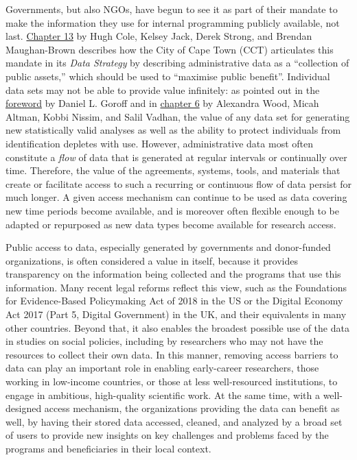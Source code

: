 Governments, but also NGOs, have begun to see it as part of their mandate to make the information they use for internal programming publicly available, not last. \protect\hyperlink{cct}{Chapter 13} by Hugh Cole, Kelsey Jack, Derek Strong, and Brendan Maughan-Brown describes how the City of Cape Town (CCT) articulates this mandate in its \emph{Data Strategy} by describing administrative data as a ``collection of public assets,'' which should be used to ``maximise public benefit''. Individual data sets may not be able to provide value infinitely: as pointed out in the \protect\hyperlink{foreword}{foreword} by Daniel L. Goroff and in \protect\hyperlink{diffpriv}{chapter 6} by Alexandra Wood, Micah Altman, Kobbi Nissim, and Salil Vadhan, the value of any data set for generating new statistically valid analyses as well as the ability to protect individuals from identification depletes with use. However, administrative data most often constitute a \emph{flow} of data that is generated at regular intervals or continually over time. Therefore, the value of the agreements, systems, tools, and materials that create or facilitate access to such a recurring or continuous flow of data persist for much longer. A given access mechanism can continue to be used as data covering new time periods become available, and is moreover often flexible enough to be adapted or repurposed as new data types become available for research access.

Public access to data, especially generated by governments and donor-funded organizations, is often considered a value in itself, because it provides transparency on the information being collected and the programs that use this information. Many recent legal reforms reflect this view, such as the Foundations for Evidence-Based Policymaking Act of 2018 in the US or the Digital Economy Act 2017 (Part 5, Digital Government) in the UK, and their equivalents in many other countries. Beyond that, it also enables the broadest possible use of the data in studies on social policies, including by researchers who may not have the resources to collect their own data. In this manner, removing access barriers to data can play an important role in enabling early-career researchers, those working in low-income countries, or those at less well-resourced institutions, to engage in ambitious, high-quality scientific work. At the same time, with a well-designed access mechanism, the organizations providing the data can benefit as well, by having their stored data accessed, cleaned, and analyzed by a broad set of users to provide new insights on key challenges and problems faced by the programs and beneficiaries in their local context.

